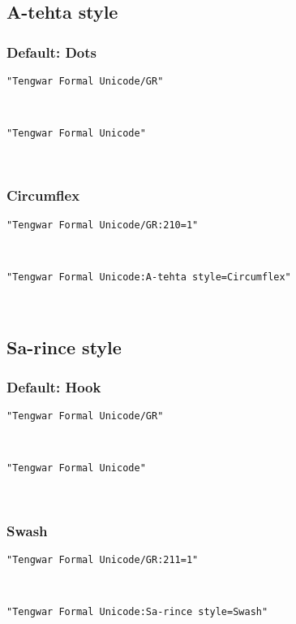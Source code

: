 \documentclass[11pt,a4paper]{article}
\begin{document}
\subsection{A-tehta style}

\subsubsection{Default: Dots}

\texttt{"Tengwar Formal Unicode/GR"}

\formalGR 

\noindent \texttt{"Tengwar Formal Unicode"}

\formalAAT 

\subsubsection{Circumflex}

\texttt{"Tengwar Formal Unicode/GR:210=1"}

\formalGRcircumflex 

\noindent \texttt{"Tengwar Formal Unicode:A-tehta style=Circumflex"}

\formalAATcircumflex 


\subsection{Sa-rince style}

\subsubsection{Default: Hook}

\texttt{"Tengwar Formal Unicode/GR"}

\formalGR 

\noindent \texttt{"Tengwar Formal Unicode"}

\formalAAT 

\subsubsection{Swash}

\texttt{"Tengwar Formal Unicode/GR:211=1"}

\formalGRswash 

\noindent \texttt{"Tengwar Formal Unicode:Sa-rince style=Swash"}

\formalAATswash 
\end{document}
